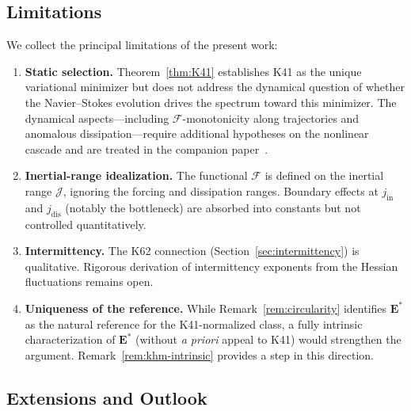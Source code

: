 \documentclass[12pt,a4paper]{article}
\theoremstyle{definition}
\theoremstyle{plain}
\theoremstyle{remark}
\begin{document}
\subsection{Limitations}

We collect the principal limitations of the present work:
\begin{enumerate}
\item \textbf{Static selection.}\; Theorem~\ref{thm:K41} establishes K41
  as the unique variational minimizer but does not address the dynamical
  question of whether the Navier--Stokes evolution drives the spectrum
  toward this minimizer.  The dynamical aspects---including
  $\mathcal{F}$-monotonicity along trajectories and anomalous
  dissipation---require additional hypotheses on the nonlinear cascade
  and are treated in the companion paper~\cite{Geiger2026b}.
\item \textbf{Inertial-range idealization.}\; The functional $\mathcal{F}$
  is defined on the inertial range $\mathcal{J}$, ignoring the forcing
  and dissipation ranges.  Boundary effects at $j_{\mathrm{in}}$ and
  $j_{\mathrm{dis}}$ (notably the bottleneck) are absorbed into constants
  but not controlled quantitatively.
\item \textbf{Intermittency.}\; The K62 connection (Section~\ref{sec:intermittency})
  is qualitative.  Rigorous derivation of intermittency exponents from
  the Hessian fluctuations remains open.
\item \textbf{Uniqueness of the reference.}\; While Remark~\ref{rem:circularity}
  identifies $\mathbf{E}^*$ as the natural reference for the K41-normalized class,
  a fully intrinsic characterization of $\mathbf{E}^*$ (without
  \emph{a priori} appeal to K41) would strengthen the argument.
  Remark~\ref{rem:khm-intrinsic} provides a step in this direction.
\end{enumerate}

\subsection{Extensions and Outlook}
\end{document}

